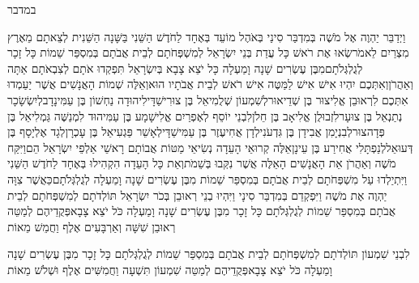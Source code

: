 \documentclass[../main/main.tex]{subfiles}
\begin{document}
\thispagestyle{empty}
\Incipit{}במדבר
\cleardoublepage
\RTLmulticolcolumns
\begin{multicols*}{\ncols}
וַיְדַבֵּר יַהְוֶה אֶל מֹשֶׁה בְּמִדְבַּר סִינַי בְּאֹהֶל מוֹעֵד בְּאֶחָד לַחֹדֶשׁ הַשֵּׁנִי בַּשָּׁנָה הַשֵּׁנִית לְצֵאתָם מֵאֶרֶץ מִצְרַיִם לֵאמֹר\PreVerseSpace{}שְׂאוּ אֶת רֹאשׁ כָּל עֲדַת בְּנֵי יִשְׂרָאֵל לְמִשְׁפְּחֹתָם לְבֵית אֲבֹתָם בְּמִסְפַּר שֵׁמוֹת כָּל זָכָר לְגֻלְגְּלֹתָם\PreVerseSpace{}מִבֶּן עֶשְׂרִים שָׁנָה וָמַעְלָה כָּל יֹצֵא צָבָא בְּיִשְׂרָאֵל תִּפְקְדוּ אֹתָם לְצִבְאֹתָם אַתָּה וְאַהֲרֹן\PreVerseSpace{}וְאִתְּכֶם יִהְיוּ אִישׁ אִישׁ לַמַּטֶּה אִישׁ רֹאשׁ לְבֵית אֲבֹתָיו הוּא\PreVerseSpace{}וְאֵלֶּה שְׁמוֹת הָאֲנָשִׁים אֲשֶׁר יַעַמְדוּ אִתְּכֶם לִרְאוּבֵן אֱלִיצוּר בֶּן שְׁדֵיאוּר\PreVerseSpace{}לְשִׁמְעוֹן שְׁלֻמִיאֵל בֶּן צוּרִישַׁדָּי\PreVerseSpace{}לִיהוּדָה נַחְשׁוֹן בֶּן עַמִּינָדָב\PreVerseSpace{}לְיִשְׂשָׂכָר נְתַנְאֵל בֶּן צוּעָר\PreVerseSpace{}לִזְבוּלֻן אֱלִיאָב בֶּן חֵלֹן\PreVerseSpace{}לִבְנֵי יוֹסֵף לְאֶפְרַיִם אֱלִישָׁמָע בֶּן עַמִּיהוּד לִמְנַשֶּׁה גַּמְלִיאֵל בֶּן פְּדָהצוּר\PreVerseSpace{}לְבִנְיָמִן אֲבִידָן בֶּן גִּדְעֹנִי\PreVerseSpace{}לְדָן אֲחִיעֶזֶר בֶּן עַמִּישַׁדָּי\PreVerseSpace{}לְאָשֵׁר פַּגְעִיאֵל בֶּן עָכְרָן\PreVerseSpace{}לְגָד אֶלְיָסָף בֶּן דְּעוּאֵל\PreVerseSpace{}לְנַפְתָּלִי אֲחִירַע בֶּן עֵינָן\PreVerseSpace{}אֵלֶּה קְרוּאֵי\SubEnd{} הָעֵדָה נְשִׂיאֵי מַטּוֹת אֲבוֹתָם רָאשֵׁי אַלְפֵי יִשְׂרָאֵל הֵם\PreVerseSpace{}וַיִּקַּח מֹשֶׁה וְאַהֲרֹן אֵת הָאֲנָשִׁים הָאֵלֶּה אֲשֶׁר נִקְּבוּ בְּשֵׁמֹת\PreVerseSpace{}וְאֵת כָּל הָעֵדָה הִקְהִילוּ בְּאֶחָד לַחֹדֶשׁ הַשֵּׁנִי וַיִּתְיַלְדוּ עַל מִשְׁפְּחֹתָם לְבֵית אֲבֹתָם בְּמִסְפַּר שֵׁמוֹת מִבֶּן עֶשְׂרִים שָׁנָה וָמַעְלָה לְגֻלְגְּלֹתָם\PreVerseSpace{}כַּאֲשֶׁר צִוָּה יַהְוֶה אֶת מֹשֶׁה וַיִּפְקְדֵם בְּמִדְבַּר סִינָי \ClosedSection{}וַיִּהְיוּ בְנֵי רְאוּבֵן בְּכֹר יִשְׂרָאֵל תּוֹלְדֹתָם לְמִשְׁפְּחֹתָם לְבֵית אֲבֹתָם בְּמִסְפַּר שֵׁמוֹת לְגֻלְגְּלֹתָם כָּל זָכָר מִבֶּן עֶשְׂרִים שָׁנָה וָמַעְלָה כֹּל יֹצֵא צָבָא\PreVerseSpace{}פְּקֻדֵיהֶם לְמַטֵּה רְאוּבֵן שִׁשָּׁה וְאַרְבָּעִים אֶלֶף וַחֲמֵשׁ מֵאוֹת\OpenSection{}\par
{}לִבְנֵי שִׁמְעוֹן תּוֹלְדֹתָם לְמִשְׁפְּחֹתָם לְבֵית אֲבֹתָם  בְּמִסְפַּר שֵׁמוֹת לְגֻלְגְּלֹתָם כָּל זָכָר מִבֶּן עֶשְׂרִים שָׁנָה וָמַעְלָה כֹּל יֹצֵא צָבָא\PreVerseSpace{}פְּקֻדֵיהֶם לְמַטֵּה שִׁמְעוֹן תִּשְׁעָה וַחֲמִשִּׁים אֶלֶף וּשְׁלֹשׁ מֵאוֹת\OpenSection{}\par

\end{multicols*}
\end{document}

